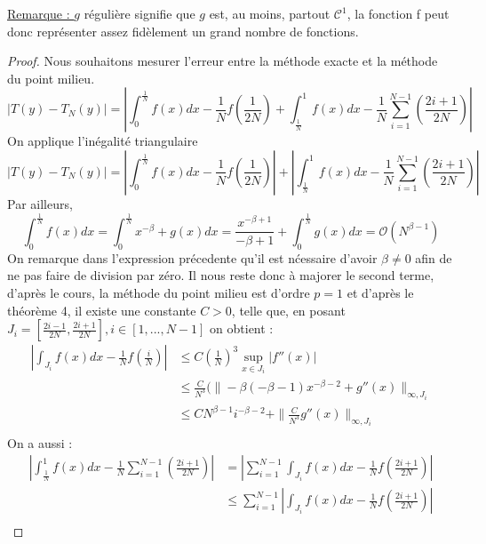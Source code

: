\documentclass[a4paper,10pt]{article}
\begin{document}
\underline{Remarque : } $g$ r\'eguli\`ere signifie que $g$ est, au moins, partout $\mathcal{C}^1$, la fonction f peut donc repr\'esenter assez fid\`element un grand nombre de fonctions.
\begin{proof}
 Nous souhaitons mesurer l'erreur entre la m\'ethode exacte et la m\'ethode du point milieu.
 \begin{equation}
  |T(y) - T_N(y)| = |\int_0^\frac{1}{N}f(x)dx - \frac{1}{N}f(\frac{1}{2N}) + \int_\frac{1}{N}^1f(x)dx - \frac{1}{N}\sum_{i=1}^{N-1}(\frac{2i + 1}{2N})|
 \end{equation}
 On applique l'in\'egalit\'e triangulaire
 \begin{equation}
  |T(y) - T_N(y)| = |\int_0^\frac{1}{N}f(x)dx - \frac{1}{N}f(\frac{1}{2N})| + |\int_\frac{1}{N}^1f(x)dx - \frac{1}{N}\sum_{i=1}^{N-1}(\frac{2i + 1}{2N})|
 \end{equation}
Par ailleurs,
\begin{equation}
\label{firstpart}
 \int_0^{\frac{1}{N}}f(x)dx = \int_0^{\frac{1}{N}} x^{-\beta} + g(x)dx = \frac{x^{-\beta + 1}}{-\beta + 1} + \int_0^{\frac{1}{N}}g(x)dx = \mathcal{O}(N^{\beta - 1})
\end{equation}
On remarque dans l'expression pr\'ecedente qu'il est n\'cessaire d'avoir $\beta \neq 0$ afin de ne pas faire de division par z\'ero.
Il nous reste donc \`a majorer le second terme, d'apr\`es le cours, la m\'ethode du point milieu est d'ordre $p = 1$ et d'apr\`es le th\'eor\`eme 4, il existe une constante $ C > 0$, telle que,
en posant $J_i = [\frac{2i-1}{2N},\frac{2i+1}{2N}], i \in [ 1,..., N-1]$ on obtient :
\begin{equation}
\begin{align}
 |\int_{J_i} f(x)dx - \frac{1}{N}f(\frac{i}{N})| &\leq C(\frac{1}{N})^3 \sup_{x \in J_i}|f''(x)|\\
						 &\leq \frac{C}{N^3}(\| -\beta(-\beta - 1)x^{-\beta - 2} + g''(x)  \|_{\infty, J_i} \\
						 &\leq C N^{\beta - 1}i^{-\beta - 2} + \|\frac{C}{N^3}g''(x)  \|_{\infty, J_i} \\
\end{align}
\end{equation}
On a aussi :
\begin{equation}
 \begin{align} 
 |\int_\frac{1}{N}^1f(x)dx - \frac{1}{N}\sum_{i=1}^{N-1}(\frac{2i + 1}{2N})| &=  |\sum_{i=1}^{N-1}\int_{J_i} f(x)dx - \frac{1}{N}f(\frac{2i + 1}{2N})|\\
									     &\leq  \sum_{i=1}^{N-1}|\int_{J_i} f(x)dx - \frac{1}{N}f(\frac{2i + 1}{2N})|\\

\end{align}
\end{equation}
\end{proof}
\end{document}
